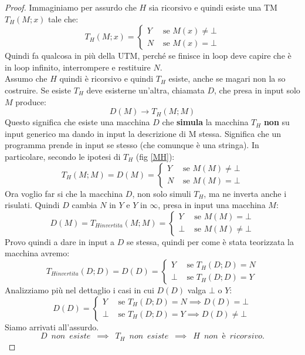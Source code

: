 \begin{proof}
  Immaginiamo per assurdo che $H$ sia ricorsivo e quindi esiste una TM $T_H(M;x)$ tale che:
  \[T_H(M;x) =
    \begin{cases}
      Y& \mbox{ se }M(x)\neq \bot\\
      N& \mbox{ se }M(x) = \bot
      \label{MH}
    \end{cases}
  \]
  Quindi fa qualcosa in più della UTM, perché se finisce in loop deve capire che
  è in loop infinito, interrompere e restituire $N$.\\
  Assumo che $H$ quindi è ricorsivo e quindi $T_H$ esiste, anche se magari non
  la so costruire. Se esiste $T_H$ deve esisterne un'altra, chiamata $D$, che
  presa in input solo $M$ produce:
  \[D(M)\to T_H(M;M)\]
  Questo significa che esiste una macchina $D$ che \textbf{simula} la macchina $T_H$ \textbf{non} su input generico ma dando in input la descrizione di M stessa. Significa che un programma prende in input se stesso (che comunque è una stringa). In particolare, secondo le ipotesi di $T_H$ (fig \ref{MH}):
  \[T_H(M;M)= D(M) = 
    \begin{cases}
      Y& \mbox{ se }M(M)\neq \bot\\
      N& \mbox{ se }M(M)=\bot
    \end{cases}
  \]
  Ora voglio far si che la macchina $D$, non solo simuli $T_H$, ma ne inverta anche i risulati. Quindi $D$ cambia $N$ in $Y$ e $Y$ in $\infty$, presa in input una macchina
  $M$:
    \[D(M) = T_{Hinvertita}(M;M) =
    \begin{cases}
      Y& \mbox{ se }M(M) = \bot\\
      \bot& \mbox{ se }M(M)\neq \bot
    \end{cases}
  \]
  Provo quindi a dare in input a $D$ se stessa, quindi per come è stata teorizzata la macchina avremo:
  \[T_{Hinvertita}(D;D) = D(D) = 
    \begin{cases}
      Y& \mbox{ se }T_H(D;D) = N\\
      \bot & \mbox{ se }T_H(D;D) = Y
    \end{cases}
  \]
  Analizziamo più nel dettaglio i casi in cui $D(D)$ valga $\bot$ o $Y$:
    \[D(D) = 
    \begin{cases}
      Y& \mbox{ se }T_H(D;D) = N \implies D(D) = \bot\\
      \bot & \mbox{ se }T_H(D;D) = Y  \implies D(D) \neq\bot
    \end{cases}
  \]
  Siamo arrivati all'assurdo.  \\
  \[D\,\,\,non\,\,\,esiste\,\,\,\implies\,\,\,T_H\,\,\,non\,\,\,esiste\,\,\,\implies\,\,\,H\,\,\,non\,\,\,è\,\,\,ricorsivo.\]
\end{proof}
